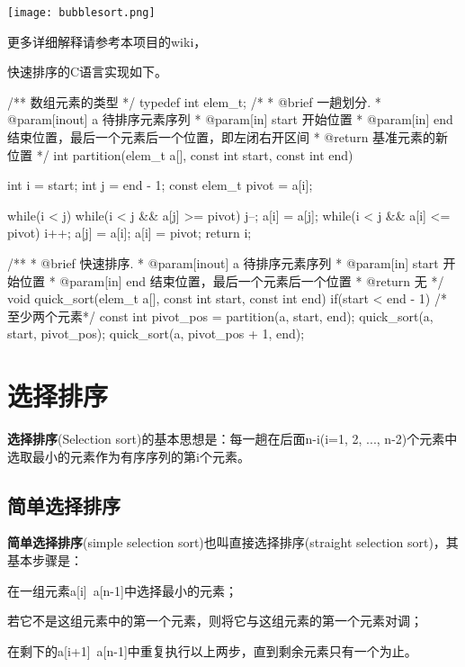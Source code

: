 \begin{center}
\texttt{[image: bubblesort.png]}\\
\label{fig:bubblesort}
\end{center}

更多详细解释请参考本项目的wiki，

快速排序的C语言实现如下。
\begin{Codex}[label=quick_sort.c]
/** 数组元素的类型 */
typedef int elem_t;
 /*
  * @brief 一趟划分.
  * @param[inout] a 待排序元素序列
  * @param[in] start 开始位置
  * @param[in] end 结束位置，最后一个元素后一个位置，即左闭右开区间
  * @return 基准元素的新位置
  */
int partition(elem_t a[], const int start, const int end) {
    int i = start;
    int j = end - 1;
    const elem_t pivot = a[i];

    while(i < j) {
        while(i < j && a[j] >= pivot) j--;
        a[i] = a[j];
        while(i < j && a[i] <= pivot) i++;
        a[j] = a[i];
    }
    a[i] = pivot;
    return i;
}

/**
  * @brief 快速排序.
  * @param[inout] a 待排序元素序列
  * @param[in] start 开始位置
  * @param[in] end 结束位置，最后一个元素后一个位置
  * @return 无
  */
void quick_sort(elem_t a[], const int start, const int end) {
    if(start < end - 1) { /* 至少两个元素*/
        const int pivot_pos = partition(a, start, end);
        quick_sort(a, start, pivot_pos);
        quick_sort(a, pivot_pos + 1, end);
    }
}
\end{Codex}


\section{选择排序} %
\textbf{选择排序}(Selection sort)的基本思想是：每一趟在后面n-i(i=1, 2, ..., n-2)个元素中选取最小的元素作为有序序列的第i个元素。


\subsection{简单选择排序}
\textbf{简单选择排序}(simple selection sort)也叫直接选择排序(straight selection sort)，其基本步骤是：
\begindot
\item 在一组元素a[i]~a[n-1]中选择最小的元素；
\item 若它不是这组元素中的第一个元素，则将它与这组元素的第一个元素对调；
\item 在剩下的a[i+1]~a[n-1]中重复执行以上两步，直到剩余元素只有一个为止。
\myenddot

